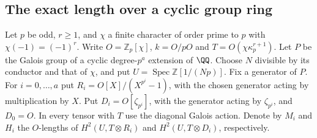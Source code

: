 \documentclass[a4paper,11pt]{article}
\theoremstyle{definition}
\theoremstyle{remark}
\newcommand{\ZZ}{\mathbb Z}\newcommand{\ord}{\operatorname{ord}}
\numberwithin{equation}{section}
\begin{document}
\subsection{The exact length over a cyclic group ring}\label{nav:IV-45}
Let \(p\) be odd, \(r\ge1\), and \(\chi\) a finite character
of order prime to \(p\) with \(\chi(-1)=(-1)^r\).
Write \(O=\ZZ_p[\chi]\), \(k=O/pO\) and
\(T=O(\chi\kappa_p^{r+1})\). Let \(P\) be the Galois group of
a cyclic degree-\(p^a\) extension of \(\QQ\). Choose \(N\)
divisible by its conductor and that of \(\chi\), and put
\(U=\operatorname{Spec}\ZZ[1/(Np)]\). Fix a generator of \(P\).
For \(i=0,\ldots,a\) put \(R_i=O[X]/(X^{p^i}-1)\), with the
chosen generator acting by multiplication by \(X\). Put
\(D_i=O[\zeta_{p^i}]\), with the generator acting by
\(\zeta_{p^i}\), and \(D_0=O\). In every tensor with \(T\) use
the diagonal Galois action. Denote by \(M_i\) and \(H_i\)
the \(O\)-lengths of \(H^2(U,T\otimes R_i)\) and
\(H^2(U,T\otimes D_i)\), respectively.
\end{document}
